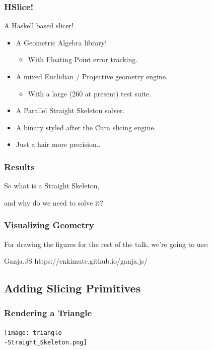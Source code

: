 \documentclass[hyperref={pdfpagemode=FullScreen},aspectratio=169]{beamer}
\begin{document}
\begin{frame}
  \frametitle{HSlice!}
  A Haskell based slicer!
  \begin{itemize}
    \item A Geometric Algebra library!
      \begin{itemize}
      \item With Floating Point error tracking.
      \end{itemize}
    \item A mixed Euclidian / Projective geometry engine.
      \begin{itemize}
      \item With a large (260 at present) test suite.
      \end{itemize}
    \item A Parallel Straight Skeleton solver.
    \item A binary styled after the Cura slicing engine.
    \item Just a hair more precision..
  \end{itemize}
\end{frame}

\begin{frame}
  \frametitle{Results}
  \Huge{\centerline{So what is a Straight Skeleton,}}\par
  \Huge{\centerline{and why do we need to solve it?}}
\end{frame}

\begin{frame}
  \frametitle{Visualizing Geometry}
  For drawing the figures for the rest of the talk, we're going to use:
  \begin{block}{Ganja.JS}
    https://enkimute.github.io/ganja.js/
  \end{block}
\end{frame}

\subsection{Adding Slicing Primitives}

\begin{frame}
  \frametitle{Rendering a Triangle}
    \texttt{[image: triangle\\-Straight\_Skeleton.png]}
\end{frame}
\end{document}
